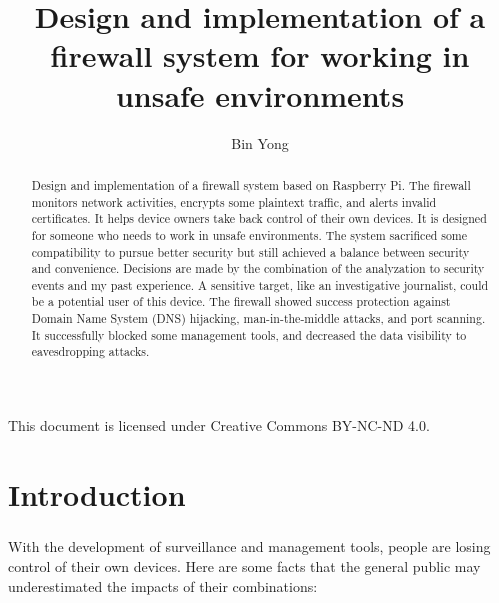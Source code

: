 \documentclass[mscthesis]{usiinfthesis}
\title{Design and implementation of a firewall system for working in unsafe environments} %
\author{Bin Yong} %
\begin{document}

\maketitle %

\frontmatter %

\begin{abstract}
  \paragraph{}
  Design and implementation of a firewall system based on Raspberry Pi. The firewall monitors network activities, encrypts some plaintext traffic, and alerts invalid certificates. It helps device owners take back control of their own devices. It is designed for someone who needs to work in unsafe environments. The system sacrificed some compatibility to pursue better security but still achieved a balance between security and convenience. Decisions are made by the combination of the analyzation to security events and my past experience. A sensitive target, like an investigative journalist, could be a potential user of this device. The firewall showed success protection against Domain Name System (DNS) hijacking, man-in-the-middle attacks, and port scanning. It successfully blocked some management tools, and decreased the data visibility to eavesdropping attacks.
\end{abstract}

\begin{acknowledgements}
  \paragraph{}
  This document is licensed under Creative Commons BY-NC-ND 4.0.
\end{acknowledgements}

\tableofcontents
\listoffigures %
\listoftables %

\mainmatter

\chapter{Introduction}
\paragraph{}
With the development of surveillance and management tools, people are losing control of their own devices. Here are some facts that the general public may underestimated the impacts of their combinations:
\end{document}
